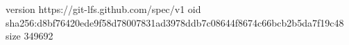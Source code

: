 version https://git-lfs.github.com/spec/v1
oid sha256:d8bf76420ede9f58d78007831ad3978ddb7c08644f8674c66bcb2b5da7f19c48
size 349692

